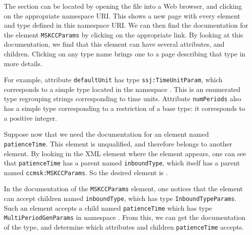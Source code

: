 The section can be located by opening the file
 into a Web browser, and clicking on the
appropriate namespace URI.
This shows a new page with every element and type defined in this
namespace URI.
We can then find the documentation for the
element
\texttt{MSKCCParams} by clicking on the appropriate link.
By looking at this documentation, we find that this element can have
several attributes, and children.
Clicking on any type name brings one to a page describing that type in
more details.

For example, attribute \texttt{defaultUnit} has type
\texttt{ssj:TimeUnitParam}, which corresponds to a simple type located
in the namespace
.
This is an enumerated type regrouping strings corresponding to time
units.
Attribute \texttt{numPeriods} also has a simple type corresponding to
a restriction of a base type: it corresponds to a positive integer.

Suppose now that we need the documentation for an element
named \texttt{patience\-Time}.
This element is unqualified, and therefore belongs to another element.
By looking in the XML element where the element appears, one can see
that \texttt{patience\-Time} has a parent named
\texttt{inbound\-Type}, which itself has a parent
named \texttt{ccmsk:MSKCCParams}.
So the desired element is
.

In the documentation of the \texttt{MSKCCParams} element,
one notices that the element can accept children named
\texttt{inboundType}, which has type
\texttt{InboundTypeParams}. Such an element accepts a child
named \texttt{patience\-Time} which has type
\texttt{MultiPeriodGenParams} in namespace
.
From this, we can get the documentation of the type, and determine
which attributes and children \texttt{patience\-Time} accepts.

